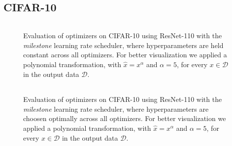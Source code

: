 \subsection{CIFAR-10}
\begin{figure}[h!]
    \centering
    \begin{tabular}{cc}
         \\ %
    \end{tabular}
    \caption{Evaluation of optimizers on CIFAR-10 using ResNet-110 with the \emph{milestone} learning rate scheduler, where hyperparameters
    are held constant across all optimizers. For better visualization we applied a polynomial transformation, with $\hat{x}=x^\alpha$ and $\alpha=5$, for every $x \in \mathcal{D}$ in the output data $ \mathcal{D}$.}
    \label{fig:cifar-10-milestone-real}
\end{figure}

\begin{figure}[h!]
    \centering
    \begin{tabular}{cc}
         \\ %
    \end{tabular}
    \caption{Evaluation of optimizers on CIFAR-10 using ResNet-110 with the \emph{milestone} learning rate scheduler, where hyperparameters
    are choosen optimally across all optimizers.
    For better visualization we applied a polynomial transformation, with $\hat{x}=x^\alpha$ and $\alpha=5$, for every $x \in \mathcal{D}$ in the output data $ \mathcal{D}$.
    }
    \label{fig:cifar-10-milestone-second-best}
\end{figure}

